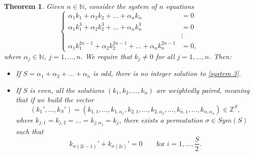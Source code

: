 \documentclass[10pt,a4paper]{amsart}
\newtheorem{theorem}{Theorem}
\def \N{\mathbb N}
\def \Z{\mathbb Z}
\begin{document}
\begin{theorem} \label{thm: system for resonant 2}
Given $n\in\N$, consider the system of $n$ equations
\begin{equation}
\begin{cases}
\alpha_1 k_1 + \alpha_2 k_2+\ldots+ \alpha_n k_n & = 0 \\
\alpha_1 k_1^3 + \alpha_2 k_2^3 + \ldots+ \alpha_n k_n^3 & = 0 \\
& \vdots \\
\alpha_1 k_1^{2n-1} + \alpha_2 k_2^{2n-1} +\ldots + \alpha_n k_n^{2n-1} & =0,
\end{cases}
\label{system 3}
\end{equation}
where $\alpha_j \in \N$, $j=1,\ldots, n$. We require that $k_j \neq 0$ for all $j=1,\ldots,n$. Then:

\begin{itemize}
\item If $S = \alpha_1 + \alpha_2 + \ldots + \alpha_n$ is odd, there is no integer solution to \eqref{system 3}. 

\item If $S$ is even, all the solutions $(k_1,k_2,\ldots,k_n)$ are \emph{weightedly paired}, meaning that if we build the vector 
\[
(k_1',\ldots,k_S')=(k_{1,1},\ldots,k_{1,\alpha_1},k_{2,1},\ldots,k_{2,\alpha_2},\ldots,k_{n,1},\ldots,k_{n,\alpha_n}) \in \Z^{S},
\]
where $k_{j,1}=k_{j,2}=\ldots=k_{j,\alpha_j}=k_j$, there exists a permutation $\sigma \in Sym(S)$ such that 
\[
k_{\sigma(2i-1)}'+k_{\sigma(2i)}'=0 \qquad \text{for $i=1,\ldots,\frac{S}{2}.$}
\]
\end{itemize}
\end{theorem}
\end{document}
